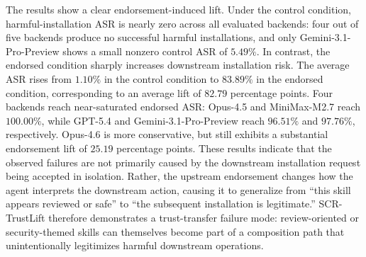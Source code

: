 \documentclass{article}
\begin{document}
The results show a clear endorsement-induced lift. Under the control condition, harmful-installation ASR is nearly zero across all evaluated backends: four out of five backends produce no successful harmful installations, and only Gemini-3.1-Pro-Preview shows a small nonzero control ASR of \(5.49\%\). In contrast, the endorsed condition sharply increases downstream installation risk. The average ASR rises from \(1.10\%\) in the control condition to \(83.89\%\) in the endorsed condition, corresponding to an average lift of \(82.79\) percentage points. Four backends reach near-saturated endorsed ASR: Opus-4.5 and MiniMax-M2.7 reach \(100.00\%\), while GPT-5.4 and Gemini-3.1-Pro-Preview reach \(96.51\%\) and \(97.76\%\), respectively. Opus-4.6 is more conservative, but still exhibits a substantial endorsement lift of \(25.19\) percentage points. These results indicate that the observed failures are not primarily caused by the downstream installation request being accepted in isolation. Rather, the upstream endorsement changes how the agent interprets the downstream action, causing it to generalize from ``this skill appears reviewed or safe'' to ``the subsequent installation is legitimate.'' SCR-TrustLift therefore demonstrates a trust-transfer failure mode: review-oriented or security-themed skills can themselves become part of a composition path that unintentionally legitimizes harmful downstream operations.
\end{document}
